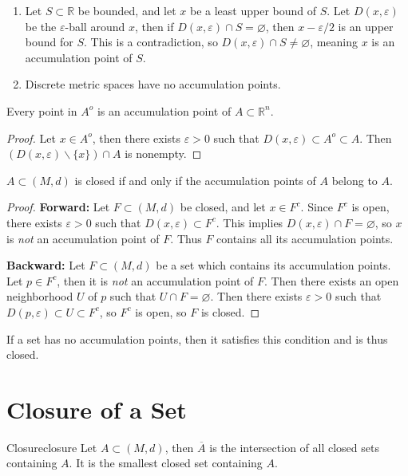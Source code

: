 \documentclass[10pt]{report}
\begin{document}
\begin{ex}{}{}
	\begin{enumerate}
		\item Let $S \subset \mathbb{R}$ be bounded, and let $x$ be a least upper bound of $S$. Let $D(x,\varepsilon)$ be the $\varepsilon$-ball around $x$, then if $D(x,\varepsilon) \cap S = \varnothing$, then $x - \varepsilon/2$ is an upper bound for $S$. This is a contradiction, so $D(x,\varepsilon) \cap S \neq \varnothing$, meaning $x$ is an accumulation point of $S$.
		\item Discrete metric spaces have no accumulation points.
	\end{enumerate}
\end{ex}

\begin{prop}
	Every point in $A^o$ is an accumulation point of $A \subset \mathbb{R}^n$.
\end{prop}
\begin{proof}
	Let $x \in A^o$, then there exists $\varepsilon>0$ such that $D(x,\varepsilon) \subset A^o \subset A$. Then $(D(x,\varepsilon) \backslash \{x\}) \cap A$ is nonempty.
\end{proof}

\begin{prop}
	\label{acc-closed}
	$A \subset (M,d)$ is closed if and only if the accumulation points of $A$ belong to $A$.
\end{prop}
\begin{proof}
	\textbf{Forward:} Let $F \subset (M,d)$ be closed, and let $x \in F^c$. Since $F^c$ is open, there exists $\varepsilon>0$ such that $D(x,\varepsilon) \subset F^c$. This implies $D(x,\varepsilon) \cap F = \varnothing$, so $x$ is \textit{not} an accumulation point of $F$. Thus $F$ contains all its accumulation points.

	\textbf{Backward:} Let $F \subset (M,d)$ be a set which contains its accumulation points. Let $p \in F^c$, then it is \textit{not} an accumulation point of $F$. Then there exists an open neighborhood $U$ of $p$ such that $U \cap F = \varnothing$. Then there exists $\varepsilon>0$ such that $D(p,\varepsilon) \subset U \subset F^c$, so $F^c$ is open, so $F$ is closed.
\end{proof}

If a set has no accumulation points, then it satisfies this condition and is thus closed.



\section{Closure of a Set}
\begin{defn}{Closure}{closure}
	Let $A \subset (M,d)$, then $\overline{A}$ is the intersection of all closed sets containing $A$. It is the smallest closed set containing $A$.
\end{defn}
\end{document}
